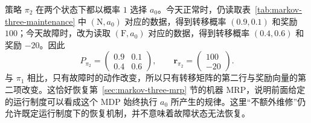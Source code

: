 \documentclass[UTF8]{ctexart}
\begin{document}
\begin{example}[正常和故障时都不额外维修]
\label{ex:markov-three-policy-no-repair}
策略 $\pi_2$ 在两个状态下都以概率 $1$ 选择 $a_0$。今天正常时，仍读取表~\ref{tab:markov-three-maintenance} 中 $(\mathrm N,a_0)$ 对应的数据，得到转移概率 $(0.9,0.1)$ 和奖励 $100$；今天故障时，改为读取 $(\mathrm F,a_0)$ 对应的数据，得到转移概率 $(0.4,0.6)$ 和奖励 $-20$。因此
\begin{equation}
  P_{\pi_2}=\begin{pmatrix}0.9&0.1\\0.4&0.6\end{pmatrix},
  \qquad
  \boldsymbol r_{\pi_2}=\begin{pmatrix}100\\-20\end{pmatrix}.
  \label{eq:markov-three-policy-no-repair-mrp}
\end{equation}
与 $\pi_1$ 相比，只有故障时的动作改变，所以只有转移矩阵的第二行与奖励向量的第二项改变。这恰好恢复第~\ref{sec:markov-three-mrp} 节的机器 MRP，说明前面给定的运行制度可以看成这个 MDP 始终执行 $a_0$ 所产生的规律。这里“不额外维修”仍允许既定运行制度下的恢复机制，并不意味着故障状态无法恢复。
\end{example}
\end{document}
